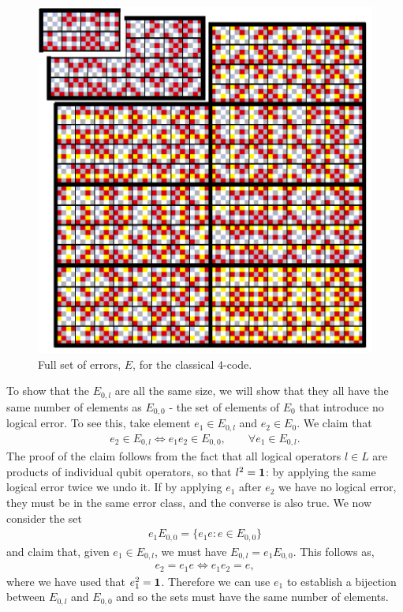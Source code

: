 \begin{figure}[htb]
  \begin{center}
    \includegraphics{figures/4_array.pdf}
  \end{center}
  \caption{Full set of errors, $E$, for the classical $4$-code.}
  \label{4_array}
\end{figure}

To show that the $E_{0, l}$ are all the same size, we will show that they all have the same number of elements as $E_{0,0}$ - the set of elements of $E_0$ that introduce no logical error. To see this, take element $e_1 \in E_{0, l}$ and $e_2 \in E_0$. We claim that
\begin{align}
  e_2 \in E_{0, l} \Leftrightarrow e_1 e_2 \in E_{0,0}, \qquad \forall e_1 \in E_{0,l}.
\end{align}
The proof of the claim follows from the fact that all logical operators $l\in L$ are products of individual qubit operators, so that $l^2 = \mathbf{1}$: by applying the same logical error twice we undo it. If by applying $e_1$ after $e_2$ we have no logical error, they must be in the same error class, and the converse is also true. We now consider the set
\begin{align}
  e_1 E_{0,0} = \{e_1 e : e \in E_{0,0}\}
\end{align}
and claim that, given $e_1 \in E_{0,l}$, we must have $E_{0, l} = e_1 E_{0,0}$. This follows as, 
\begin{align}
  e_2 =  e_1 e \Leftrightarrow e_1 e_2 = e,
\end{align}
where we have used that $e_1^2 = \mathbf{1}$. Therefore we can use $e_1$ to establish a bijection between $E_{0,l}$ and $E_{0,0}$ and so the sets must have the same number of elements.

